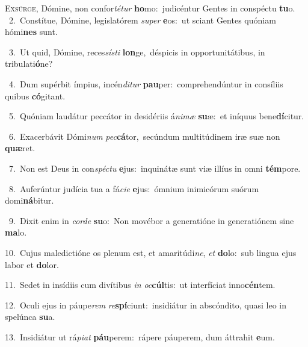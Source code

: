 \lettrine{\initial\textcolor{\initialcolor}{E}}{xsúrge,} Dómine, non confor\-\textit{té}\-\textit{tur} \textbf{ho}\-mo:~\star judicéntur Gentes in conspéctu \textbf{tu}\-o.\\
{\numbfont\textcolor{\numbcolor}{~2.}}~Constítue, Dómine, legislatórem \textit{su}\-\textit{per} \textbf{e}\-os:~\star ut sciant Gentes quóniam hómi\textbf{nes} sunt.\par
{\numbfont\textcolor{\numbcolor}{~3.}}~Ut quid, Dómine, reces\-\textit{sís}\-\textit{ti} \textbf{lon}\-ge,~\star déspicis in opportunitátibus, in tribulati\-\textbf{ó}\-ne?\par
{\numbfont\textcolor{\numbcolor}{~4.}}~Dum supérbit ímpius, incén\-\textit{di}\-\textit{tur} \textbf{pau}\-per:~\star comprehendúntur in consíliis quibus \textbf{có}\-gitant.\par
{\numbfont\textcolor{\numbcolor}{~5.}}~Quóniam laudátur peccátor in desidériis á\-\textit{ni}\-\textit{mæ} \textbf{su}\-æ:~\star et iníquus bene\-\textbf{dí}\-citur.\par
{\numbfont\textcolor{\numbcolor}{~6.}}~Exacerbávit Dómi\textit{num} \textit{pec}\-\textbf{cá}tor,~\star secúndum multitúdinem iræ suæ non \textbf{quæ}\-ret.\par
{\numbfont\textcolor{\numbcolor}{~7.}}~Non est Deus in con\-\textit{spéc}\-\textit{tu} \textbf{e}\-jus:~\star inquinátæ sunt viæ illíus in omni \textbf{tém}\-pore.\par
{\numbfont\textcolor{\numbcolor}{~8.}}~Auferúntur judícia tua a fá\-\textit{ci}\-\textit{e} \textbf{e}\-jus:~\star ómnium inimicórum suórum domi\-\textbf{ná}\-bitur.\par
{\numbfont\textcolor{\numbcolor}{~9.}}~Dixit enim in \textit{cor}\-\textit{de} \textbf{su}\-o:~\star Non movébor a generatióne in generatiónem sine \textbf{ma}\-lo.\par
{\numbfont\textcolor{\numbcolor}{10.}}~Cujus maledictióne os plenum est, et amaritúdi\-\textit{ne}\-, \textit{et} \textbf{do}\-lo:~\star sub lingua ejus labor et \textbf{do}\-lor.\par
{\numbfont\textcolor{\numbcolor}{11.}}~Sedet in insídiis cum divítibus \textit{in} \textit{oc}\-\textbf{cúl}tis:~\star ut interfíciat inno\-\textbf{cén}\-tem.\par
{\numbfont\textcolor{\numbcolor}{12.}}~Oculi ejus in páupe\textit{rem} \textit{re}\-\textbf{spí}ciunt:~\star insidiátur in abscóndito, quasi leo in spelúnca \textbf{su}\-a.\par
{\numbfont\textcolor{\numbcolor}{13.}}~Insidiátur ut rá\-\textit{pi}\-\textit{at} \textbf{páu}\-perem:~\star rápere páuperem, dum áttrahit \textbf{e}\-um.\par
